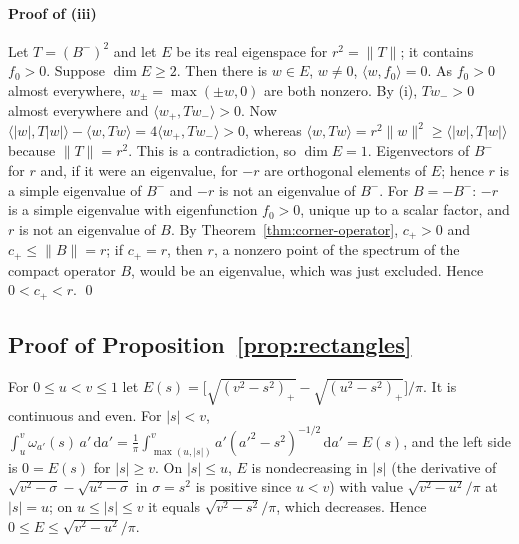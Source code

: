 \documentclass[preprint,12pt,a4paper]{elsarticle}
\theoremstyle{remark}
\newcommand{\dd}{\,\mathrm d}
\begin{document}
\paragraph{Proof of (iii)}
Let $T=(B^-)^2$ and let $E$ be its real eigenspace for $r^2=\|T\|$; it contains $f_0>0$.
Suppose $\dim E\ge2$. Then there is $w\in E$, $w\ne0$, $\langle w,f_0\rangle=0$. As $f_0>0$ almost
everywhere, $w_\pm=\max(\pm w,0)$ are both nonzero. By (i), $Tw_->0$ almost everywhere and
$\langle w_+,Tw_-\rangle>0$. Now
$\langle|w|,T|w|\rangle-\langle w,Tw\rangle=4\langle w_+,Tw_-\rangle>0$, whereas
$\langle w,Tw\rangle=r^2\|w\|^2\ge\langle|w|,T|w|\rangle$ because $\|T\|=r^2$. This is a
contradiction, so $\dim E=1$. Eigenvectors of $B^-$ for $r$ and, if it were an eigenvalue,
for $-r$ are orthogonal elements of $E$; hence $r$ is a simple eigenvalue of $B^-$ and $-r$ is
not an eigenvalue of $B^-$. For $B=-B^-$: $-r$ is a simple eigenvalue with eigenfunction $f_0>0$,
unique up to a scalar factor, and $r$ is not an eigenvalue of $B$. By
Theorem~\ref{thm:corner-operator}, $c_+>0$ and $c_+\le\|B\|=r$; if $c_+=r$, then $r$,
a nonzero point of the spectrum of the compact operator $B$, would be an
eigenvalue, which was just excluded. Hence $0<c_+<r$. \qed

\subsection{Proof of Proposition~\ref{prop:rectangles}}\label{app:rect-proof}

For $0\le u<v\le1$ let $E(s)=\bigl[\sqrt{(v^2-s^2)_+}-\sqrt{(u^2-s^2)_+}\bigr]/\pi$. It is
continuous and even. For $|s|<v$, $\int_u^v\omega_{a'}(s)\,a'\dd a'=\frac1\pi\int_{\max(u,|s|)}^va'(a'^2-s^2)^{-1/2}\dd a'=E(s)$,
and the left side is $0=E(s)$ for $|s|\ge v$. On $|s|\le u$, $E$ is nondecreasing in $|s|$
(the derivative of $\sqrt{v^2-\sigma}-\sqrt{u^2-\sigma}$ in $\sigma=s^2$ is positive since
$u<v$) with value $\sqrt{v^2-u^2}/\pi$ at $|s|=u$; on $u\le|s|\le v$ it equals
$\sqrt{v^2-s^2}/\pi$, which decreases. Hence $0\le E\le\sqrt{v^2-u^2}/\pi$.
\end{document}
